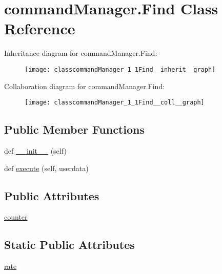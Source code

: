 \hypertarget{classcommandManager_1_1Find}{}\section{command\+Manager.\+Find Class Reference}
\label{classcommandManager_1_1Find}


Inheritance diagram for command\+Manager.\+Find\+:\nopagebreak
\begin{figure}[H]
\begin{center}
\leavevmode
\texttt{[image: classcommandManager\_1\_1Find\_\_inherit\_\_graph]}
\end{center}
\end{figure}


Collaboration diagram for command\+Manager.\+Find\+:\nopagebreak
\begin{figure}[H]
\begin{center}
\leavevmode
\texttt{[image: classcommandManager\_1\_1Find\_\_coll\_\_graph]}
\end{center}
\end{figure}
\subsection*{Public Member Functions}
\begin{DoxyCompactItemize}
\item 
def \hyperlink{classcommandManager_1_1Find_ae547a564eeb683ea6d439cd8d0508779}{\+\_\+\+\_\+init\+\_\+\+\_\+} (self)
\item 
def \hyperlink{classcommandManager_1_1Find_aef4287ee7b2f43741e7dfd8d19b42878}{execute} (self, userdata)
\end{DoxyCompactItemize}
\subsection*{Public Attributes}
\begin{DoxyCompactItemize}
\item 
\hyperlink{classcommandManager_1_1Find_a75755e326232226bbd46786c7c889473}{counter}
\end{DoxyCompactItemize}
\subsection*{Static Public Attributes}
\begin{DoxyCompactItemize}
\item 
\hyperlink{classcommandManager_1_1Find_a9c7870d56b1d25a57af7840fb2967f99}{rate}
\end{DoxyCompactItemize}


